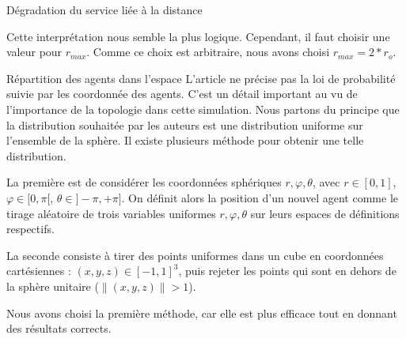 \begin{hypothese}{Dégradation du service liée à la distance}
\begin{center}
\end{center}

Cette interprétation nous semble la plus logique. Cependant, il faut choisir une valeur pour $r_{max}$. Comme ce choix est arbitraire, nous avons choisi $r_{max} = 2 * r_o$.\newline


\end{hypothese}

\begin{hypothese}{Répartition des agents dans l'espace}
L'article ne précise pas la loi de probabilité suivie par les coordonnée des agents. C'est un détail important au vu de l'importance de la topologie dans cette simulation. Nous partons du principe que la distribution souhaitée par les auteurs est une distribution uniforme sur l'ensemble de la sphère. Il existe plusieurs méthode pour obtenir une telle distribution.\newline

La première est de considérer les coordonnées sphériques $r, \varphi, \theta$, avec $r \in [0, 1]$, $\varphi \in [0, \pi[$, $\theta \in ]-\pi, +\pi]$. On définit alors la position d'un nouvel agent comme le tirage aléatoire de trois variables uniformes $r, \varphi, \theta$ sur leurs espaces de définitions respectifs.\newline

La seconde consiste à tirer des points uniformes dans un cube en coordonnées cartésiennes : $(x, y, z) \in [-1, 1]^3$, puis rejeter les points qui sont en dehors de la sphère unitaire ($\|(x, y, z)\| > 1$).\newline

Nous avons choisi la première méthode, car elle est plus efficace tout en donnant des résultats corrects.
\end{hypothese}
\vspace{10pt}
